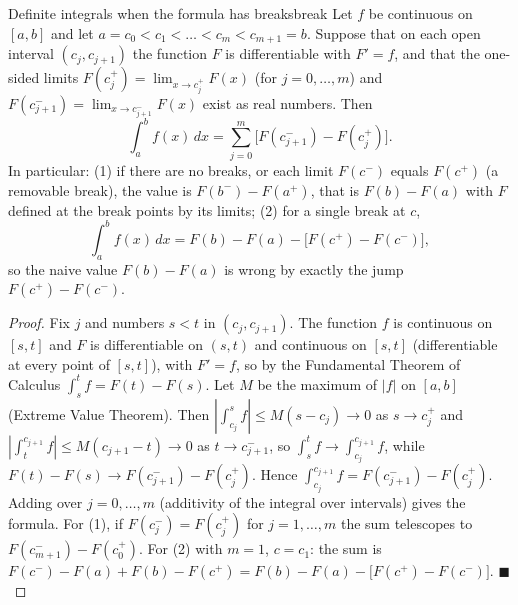 \documentclass[11pt]{article}
\begin{document}
\begin{thm}{Definite integrals when the formula has breaks}{break}
Let $f$ be continuous on $[a,b]$ and let $a=c_0<c_1<\dots<c_m<c_{m+1}=b$. Suppose that on each open interval $(c_j,c_{j+1})$ the function $F$ is differentiable with $F'=f$, and that the one-sided limits $F(c_j^+)=\lim_{x\to c_j^+}F(x)$ (for $j=0,\dots,m$) and $F(c_{j+1}^-)=\lim_{x\to c_{j+1}^-}F(x)$ exist as real numbers. Then
\[\int_a^bf(x)\,dx=\sum_{j=0}^{m}\Big[F(c_{j+1}^-)-F(c_j^+)\Big].\]
In particular: (1) if there are no breaks, or each limit $F(c^-)$ equals $F(c^+)$ (a removable break), the value is $F(b^-)-F(a^+)$, that is $F(b)-F(a)$ with $F$ defined at the break points by its limits; (2) for a single break at $c$,
\[\int_a^bf(x)\,dx=F(b)-F(a)-\Big[F(c^+)-F(c^-)\Big],\]
so the naive value $F(b)-F(a)$ is wrong by exactly the jump $F(c^+)-F(c^-)$.
\end{thm}
\begin{proof}
Fix $j$ and numbers $s<t$ in $(c_j,c_{j+1})$. The function $f$ is continuous on $[s,t]$ and $F$ is differentiable on $(s,t)$ and continuous on $[s,t]$ (differentiable at every point of $[s,t]$), with $F'=f$, so by the Fundamental Theorem of Calculus $\int_s^tf=F(t)-F(s)$. Let $M$ be the maximum of $\lvert f\rvert$ on $[a,b]$ (Extreme Value Theorem). Then $\left\lvert\int_{c_j}^sf\right\rvert\le M(s-c_j)\to0$ as $s\to c_j^+$ and $\left\lvert\int_t^{c_{j+1}}f\right\rvert\le M(c_{j+1}-t)\to0$ as $t\to c_{j+1}^-$, so $\int_s^tf\to\int_{c_j}^{c_{j+1}}f$, while $F(t)-F(s)\to F(c_{j+1}^-)-F(c_j^+)$. Hence $\int_{c_j}^{c_{j+1}}f=F(c_{j+1}^-)-F(c_j^+)$. Adding over $j=0,\dots,m$ (additivity of the integral over intervals) gives the formula. For (1), if $F(c_j^-)=F(c_j^+)$ for $j=1,\dots,m$ the sum telescopes to $F(c_{m+1}^-)-F(c_0^+)$. For (2) with $m=1$, $c=c_1$: the sum is $F(c^-)-F(a)+F(b)-F(c^+)=F(b)-F(a)-\big[F(c^+)-F(c^-)\big]$. $\blacksquare$
\end{proof}
\end{document}
